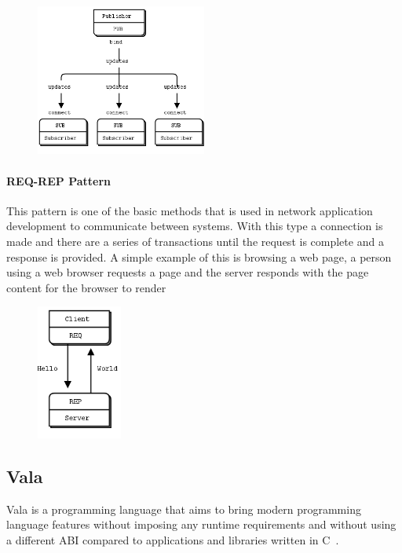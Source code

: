       \begin{figure}[H]
        \begin{center}
          \includegraphics[width=0.5\textwidth]{figures/pub-sub-pattern}
        \end{center}
      \end{figure}

    \paragraph{REQ-REP Pattern}

      This pattern is one of the basic methods that is used in network
      application development to communicate between systems. With this type a
      connection is made and there are a series of transactions until the
      request is complete and a response is provided. A simple example of this
      is browsing a web page, a person using a web browser requests a page and
      the server responds with the page content for the browser to render

      \begin{figure}[H]
        \begin{center}
          \includegraphics[width=0.25\textwidth]{figures/req-rep-pattern}
        \end{center}
      \end{figure}

  \subsection{Vala}\label{sec:tech-vala}

    Vala is a programming language that aims to bring modern programming
    language features without imposing any runtime requirements and without
    using a different ABI compared to applications and libraries written in
    C~\cite{Vala2016}.
